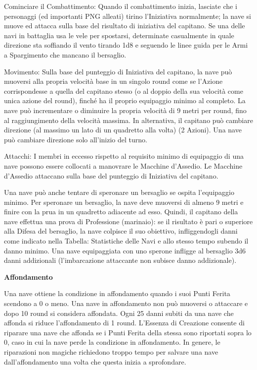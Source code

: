 \documentclass[a4paper,11pt,twoside,openany]{book}
\begin{document}
	{Cominciare il Combattimento:} Quando il combattimento inizia, lasciate che i personaggi (ed importanti PNG alleati) tirino l'Iniziativa normalmente; la nave si muove ed attacca sulla base del risultato di iniziativa del capitano. Se una delle navi in battaglia usa le vele per spostarsi, determinate casualmente in quale direzione sta soffiando il vento tirando 1d8 e seguendo le linee guida per le Armi a Spargimento che mancano il bersaglio.{}

	{Movimento:} Sulla base del punteggio di Iniziativa del capitano, la nave può muoversi alla propria velocità base in un singolo round come se l'Azione corrispondesse a quella del capitano stesso (o al doppio della sua velocità come unica azione del round), finché ha il proprio equipaggio minimo al completo. La nave può incrementare o diminuire la propria velocità di 9 metri per round, fino al raggiungimento della velocità massima. In alternativa, il capitano può cambiare direzione (al massimo un lato di un quadretto alla volta) (2 Azioni). Una nave può cambiare direzione solo all'inizio del turno.{}

	{Attacchi:} I membri in eccesso rispetto al requisito minimo di equipaggio di una nave possono essere collocati a manovrare le Macchine d'Assedio. Le Macchine d'Assedio attaccano sulla base del punteggio di Iniziativa del capitano.{}

Una nave può anche tentare di speronare un bersaglio se ospita l'equipaggio minimo. Per speronare un bersaglio, la nave deve muoversi di almeno 9 metri e finire con la prua in un quadretto adiacente ad esso.
Quindi, il capitano della nave effettua una prova di Professione (marinaio): se il risultato è pari o superiore alla Difesa del bersaglio, la nave colpisce il suo obiettivo, infliggendogli danni come indicato nella Tabella: Statistiche delle Navi e allo stesso tempo subendo il danno minimo. Una nave equipaggiata con uno sperone infligge al bersaglio 3d6 danni addizionali (l'imbarcazione attaccante non subisce danno addizionale).

\textbf{Affondamento}

Una nave ottiene la condizione in affondamento quando i suoi Punti Ferita scendono a 0 o meno. Una nave in affondamento non può muoversi o attaccare e dopo 10 round si considera affondata. Ogni 25 danni subiti da una nave che affonda si riduce l'affondamento di 1 round. L’Essenza di Creazione consente di riparare una nave che affonda se i Punti Ferita della stessa sono riportati sopra lo 0, caso in cui la nave perde la condizione in affondamento. In genere, le riparazioni non magiche richiedono troppo tempo per salvare una nave dall'affondamento una volta che questa inizia a sprofondare.
\end{document}
